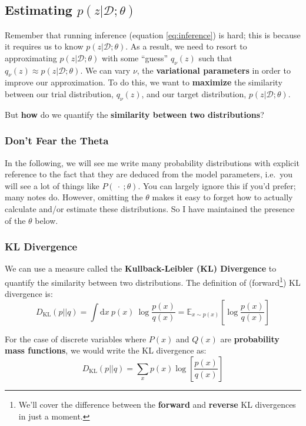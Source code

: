 \documentclass[]{article}
\begin{document}
\subsection{Estimating $p(z|\mathcal{D};\theta)$}\label{section:estimating_p|z}

Remember that running inference (equation \ref{eq:inference}) is hard; this is because it requires us to know $p(z|\mathcal{D};\theta)$. As a result, we need to resort to approximating $p(z|\mathcal{D};\theta)$ with some ``guess'' $q_\nu (z)$ such that $q_\nu (z) \approx p(z|\mathcal{D};\theta)$. We can vary $\nu$, the \textbf{variational parameters} in order to improve our approximation. To do this, we want to \textbf{maximize} the similarity between our trial distribution, $q_\nu (z)$, and our target distribution, $p(z|\mathcal{D};\theta)$.

But \textbf{how} do we quantify the \textbf{similarity between two distributions}?

\subsubsection{Don't Fear the Theta}
In the following, we will see me write many probability distributions with explicit reference to the fact that they are deduced from the model parameters, i.e.\ you will see a lot of things like $P(~\cdot~;\theta)$. You can largely ignore this if you'd prefer; many notes do. However, omitting the $\theta$ makes it easy to forget how to actually calculate and/or estimate these distributions. So I have maintained the presence of the $\theta$ below.

\subsubsection{KL Divergence}\label{section:kl_divergence}

We can use a measure called the \textbf{Kullback-Leibler (KL) Divergence} to quantify the similarity between two distributions. The definition of (forward\footnote{We'll cover the difference between the \textbf{forward} and \textbf{reverse} KL divergences in just a moment.}) KL divergence is:
\begin{equation}\label{eqn:kl_divergence_cont}
    D_\text{KL}(p||q) = \int \text{d}x ~ p(x) ~\log\frac{p(x)}{q(x)}  = \mathbb{E}_{x \sim p(x)} \left[\log \frac{p(x)}{q(x)} \right] 
\end{equation}

For the case of discrete variables where $P(x)$ and $Q(x)$ are \textbf{probability mass functions}, we would write the KL divergence as:
\begin{equation}\label{eq:kl_divergence_discrete}
    D_\text{KL}(p||q) = \sum_{x} p(x) \log \left[ \frac{p(x)}{q(x)}\right]
\end{equation}
\end{document}
